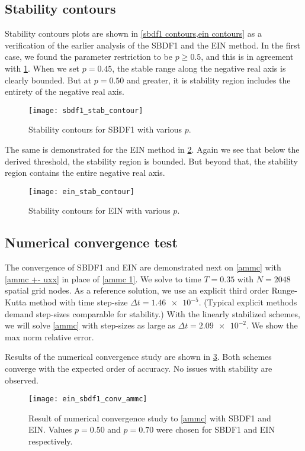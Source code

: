 \subsection{Stability contours}
Stability contours plots are shown in \cref{sbdf1 contours,ein contours} as a verification of the earlier analysis of the SBDF1 and the EIN method. In the first case, we found the parameter restriction to be $p\geq 0.5$, and this is in agreement with \cref{sbdf1 contours}. When we set $p=0.45$, the stable range along the negative real axis is clearly bounded. But at $p=0.50$ and greater, it is stability region includes the entirety of the negative real axis.
\begin{figure}[htb!]
        \centering
\texttt{[image: sbdf1\_stab\_contour]}
\caption{Stability contours for SBDF1 with various $p$.}
\label{sbdf1 contours}
\end{figure}

The same is demonstrated for the EIN method in \cref{ein contours}. Again we see that below the derived threshold, the stability region is bounded. But beyond that, the stability region contains the entire negative real axis.
\begin{figure}[htb!]
        \centering
\texttt{[image: ein\_stab\_contour]}
\caption{Stability contours for EIN with various $p$.}
\label{ein contours}
\end{figure}

\subsection{Numerical convergence test}
\label{ein conv test}
The convergence of SBDF1 and EIN are demonstrated next on \cref{ammc} with \cref{ammc +- uxx} in place of \eqref{ammc 1}. We solve to time $T=0.35$ with $N=2048$ spatial grid nodes. As a reference solution, we use an explicit third order Runge-Kutta method with time step-size $\Delta t=\num{1.46e-5}$. (Typical explicit methods demand step-sizes comparable for stability.) With the linearly stabilized schemes, we will solve \cref{ammc} with step-sizes as large as $\Delta t = \num{2.09e-2}$. We show the max norm relative error.

Results of the numerical convergence study are shown in \cref{ein_sbdf1_conv_ammc}. Both schemes converge with the expected order of accuracy. No issues with stability are observed.
\begin{figure}[htb!]
        \centering
\texttt{[image: ein\_sbdf1\_conv\_ammc]}
\caption[Numerical convergence study with SBDF1 and EIN]{Result of numerical convergence study to \cref{ammc} with SBDF1 and EIN. Values $p=0.50$ and $p=0.70$ were chosen for SBDF1 and EIN respectively.}
\label{ein_sbdf1_conv_ammc}
\end{figure}
